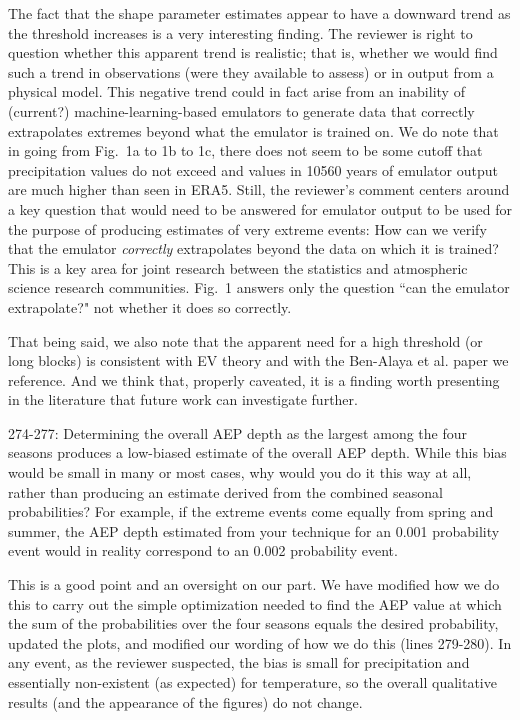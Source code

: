\documentclass[12pt,english]{reviewresponse}
\begin{document}
\begin{revresponse}
The fact that the shape parameter estimates appear to have a downward trend as the threshold increases is a very interesting finding.  The reviewer is right to question whether this apparent trend is realistic; that is, whether we would find such a trend in observations (were they available to assess) or in output from a physical model.  This negative trend could in fact arise from an inability of (current?) machine-learning-based emulators to generate data that correctly extrapolates extremes beyond what the emulator is trained on.  
We do note that in going from Fig.\ 1a to 1b to 1c, there does not seem to be some cutoff that precipitation values do not exceed and values in 10560 years of emulator output are much higher than seen in ERA5.
Still, the reviewer's comment centers around a key question that would need to be answered for emulator output to be used for the purpose of producing estimates of very extreme events:  How can we verify that the emulator {\em correctly} extrapolates beyond the data on which it is trained?  This is a key area for joint research between the statistics and atmospheric science research communities.  Fig.\ 1 answers only the question ``can the emulator extrapolate?" not whether it does so correctly. 

That being said, we also note that the apparent need for a high threshold (or long blocks) is consistent with EV theory and with the Ben-Alaya et al. paper we reference. And we think that, properly caveated, it is a finding worth presenting in the literature that future work can investigate further.

\end{revresponse}


\begin{revcomment}

274-277: Determining the overall AEP depth as the largest among the four seasons produces a low-biased estimate of the overall AEP depth.  While this bias would be small in many or most cases, why would you do it this way at all, rather than producing an estimate derived from the combined seasonal probabilities?  For example, if the extreme events come equally from spring and summer, the AEP depth estimated from your technique for an 0.001 probability event would in reality correspond to an 0.002 probability event.
\end{revcomment}

\begin{revresponse}
This is a good point and an oversight on our part. We have modified how we do this to carry out the simple optimization needed to find the AEP value at which the sum of the probabilities over the four seasons equals the desired probability, updated the plots, and modified our wording of how we do this (lines 279-280). In any event, as the reviewer suspected, the bias is small for precipitation and essentially non-existent (as expected) for temperature, so the overall qualitative results (and the appearance of the figures) do not change. 
\end{revresponse}
\end{document}

